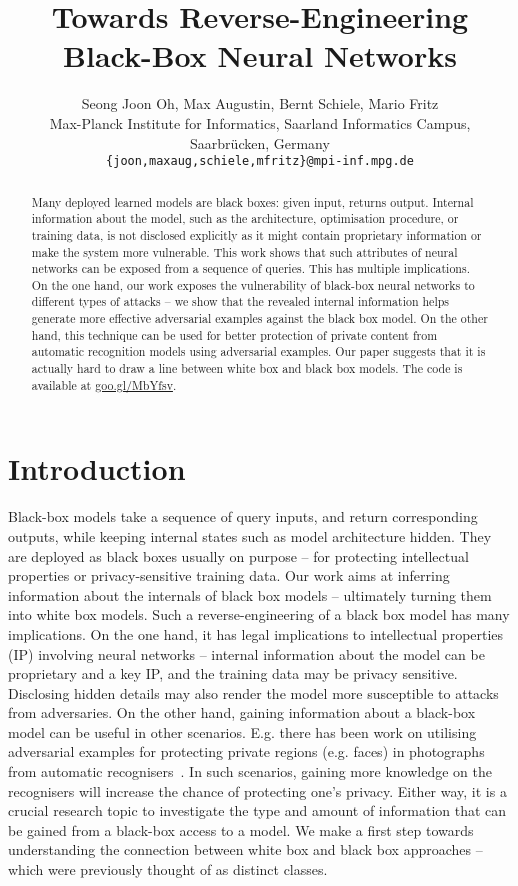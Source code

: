 \documentclass{article} %
\title{Towards Reverse-Engineering \\ Black-Box Neural Networks}
\author{Seong Joon Oh, Max Augustin, Bernt Schiele, Mario Fritz \\
Max-Planck Institute for Informatics,
Saarland Informatics Campus,
Saarbr\"{u}cken, Germany\\
\texttt{\{joon,maxaug,schiele,mfritz\}@mpi-inf.mpg.de} 
}
\begin{document}
\maketitle
\begin{abstract}
Many deployed learned models are black boxes: given input, returns output. Internal information about the model, such as the architecture, optimisation procedure, or training data, is not disclosed explicitly as it might contain proprietary information or make the system more vulnerable. This work shows that such attributes of neural networks can be exposed from a sequence of queries. This has multiple implications. On the one hand, our work exposes the vulnerability of black-box neural networks to different types of attacks -- we show that the revealed internal information helps generate more effective adversarial examples against the black box model. On the other hand, this technique can be used for better protection of private content from automatic recognition models using adversarial examples. Our paper suggests that it is actually hard to draw a line between white box and black box models. The code is available at \href{https://goo.gl/MbYfsv}{\textcolor[rgb]{.4,.8,.6}{goo.gl/MbYfsv}}.
\end{abstract}

\section{Introduction}

Black-box models take a sequence of query inputs, and return corresponding outputs, while keeping internal states such as model architecture hidden. They are deployed as black boxes usually on purpose -- for protecting intellectual properties or privacy-sensitive training data. Our work aims at inferring information about the internals of black box models -- ultimately turning them into white box models.
Such a reverse-engineering of a black box model has many implications. On the one hand, it has legal implications to intellectual properties (IP) involving neural networks -- internal information about the model can be proprietary and a key IP, and the training data may be privacy sensitive. Disclosing hidden details may also render the model more susceptible to attacks from adversaries. On the other hand, gaining information about a black-box model can be useful in other scenarios. 
E.g. there has been work on utilising adversarial examples for protecting private regions (e.g. faces) in photographs from automatic recognisers~\citep{joon2017iccv}. In such scenarios, gaining more knowledge on the recognisers will increase the chance of protecting one's privacy. Either way, it is a crucial research topic to investigate the type and amount of information that can be gained from a black-box access to a model. We make a first step towards understanding the connection between white box and black box approaches -- which were previously thought of as distinct classes. 
\end{document}
